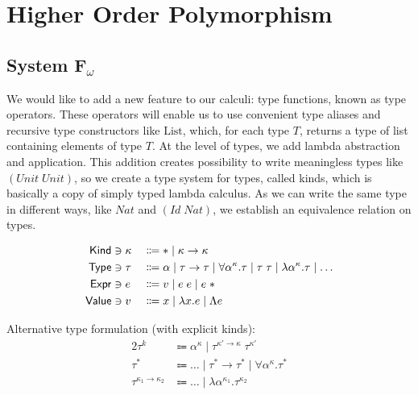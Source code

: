 \chapter{Higher Order Polymorphism}

\section{System F$_\omega$}

We would like to add a new feature to our calculi: type functions, known as type operators.
These operators will enable us to use convenient type aliases and recursive type constructors
like $\text{List}$, which, for each type $T$, returns a type of list containing elements of type $T$.
At the level of types, we add lambda abstraction and application. This addition creates
possibility to write meaningless types like $(Unit\; Unit)$, so we create a type system
for types, called kinds, which is basically a copy of simply typed lambda calculus.
As we can write the same type in different ways, like $Nat$ and $(Id\; Nat)$, we establish
an equivalence relation on types.

\begin{alignat*}{2}
  \mathsf{Kind} & \ni \kappa && \Coloneqq * \mid \kappa \to \kappa \\
  \mathsf{Type} & \ni \tau   && \Coloneqq \alpha \mid \tau \to \tau \mid
    \forall\alpha^\kappa.\tau \mid \tau\;\tau \mid \lambda\alpha^\kappa.\tau \mid \dots \\
  \mathsf{Expr} & \ni e      && \Coloneqq v \mid e\;e \mid e\;* \\
  \mathsf{Value} & \ni v     && \Coloneqq x \mid \lambda x.e \mid \Lambda e
\end{alignat*}

Alternative type formulation (with explicit kinds):
\begin{alignat*}{2}
  \tau^k & \Coloneqq \alpha^\kappa \mid \tau^{\kappa'\to\kappa}\;\tau^{\kappa'} \\
  \tau^* & \Coloneqq \dots \mid \tau^* \to \tau^* \mid \forall\alpha^\kappa.\tau^* \\
  \tau^{\kappa_1\to\kappa_2} & \Coloneqq \dots \mid \lambda\alpha^{\kappa_1}.\tau^{\kappa_2}
\end{alignat*}


